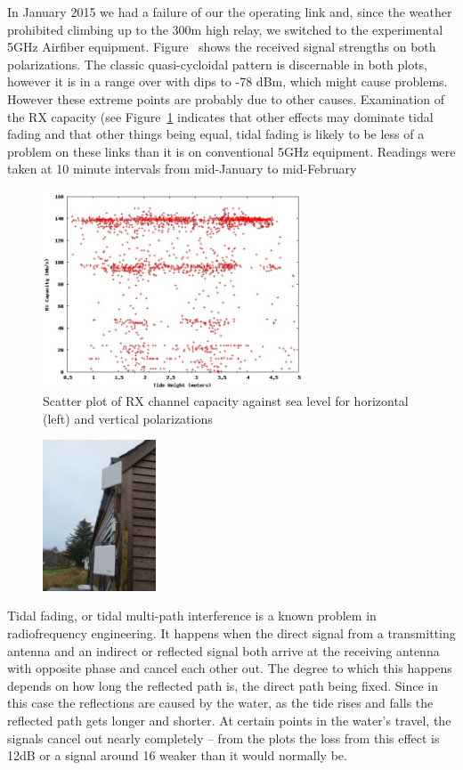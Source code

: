 In January 2015 we had a failure of our the operating link and, since
the weather prohibited climbing up to the 300m high relay, we switched
to the experimental 5GHz Airfiber equipment.
Figure~\label{fig:rxpower} shows the received signal strengths on both
polarizations.  The classic quasi-cycloidal pattern is discernable in
both plots, however it is in a range over with dips to -78 dBm, which
might cause problems.  However these extreme points are probably due
to other causes. Examination of the RX capacity (see
Figure~\ref{fig:capacity} indicates that other effects may dominate tidal
fading and that other things being equal, tidal fading is likely to be
less of a problem on these links than it is on conventional 5GHz
equipment. Readings were taken at 10 minute intervals from mid-January
to mid-February
\begin{figure}
\includegraphics[width=0.7\textwidth]{tidedata/rxcapacity.jpg}
\caption{Scatter plot of RX channel capacity against sea level for
  horizontal (left) and vertical  polarizations}
\label{fig:capacity}
\end{figure}

\begin{figure}
  \includegraphics[width=0.3\textwidth]{tommy-diversity}
\end{figure}
Tidal fading, or tidal multi-path interference is a known problem in
radiofrequency engineering. It happens when the direct signal from
a transmitting antenna and an indirect or reflected signal both arrive at
the receiving antenna with opposite phase and cancel each other
out. The degree to which this happens depends on how long the
reflected path is, the direct path being fixed. Since in this case the
reflections are caused by the water, as the tide rises and falls the
reflected path gets longer and shorter. At certain points in the
water's travel, the signals cancel out nearly completely -- from the
plots the loss from this effect is 12dB or a signal around 16 weaker
than it would normally be.

